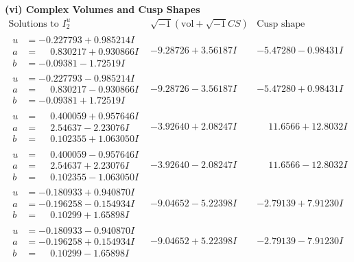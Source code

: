 \documentclass[1p]{elsarticle_modified}
\theoremstyle{definition}
\newcommand{\I}{\sqrt{-1}}
\begin{document}
\newpage\flushleft \textbf{(vi) Complex Volumes and Cusp Shapes}
$$\begin{array}{c|c|c}  
\text{Solutions to }I^u_{2}& \I (\text{vol} + \sqrt{-1}CS) & \text{Cusp shape}\\
 \hline 
\begin{aligned}
u &= -0.227793 + 0.985214 I \\
a &= \phantom{-}0.830217 + 0.930866 I \\
b &= -0.09381 - 1.72519 I\end{aligned}
 & -9.28726 + 3.56187 I & -5.47280 - 0.98431 I \\ \hline\begin{aligned}
u &= -0.227793 - 0.985214 I \\
a &= \phantom{-}0.830217 - 0.930866 I \\
b &= -0.09381 + 1.72519 I\end{aligned}
 & -9.28726 - 3.56187 I & -5.47280 + 0.98431 I \\ \hline\begin{aligned}
u &= \phantom{-}0.400059 + 0.957646 I \\
a &= \phantom{-}2.54637 - 2.23076 I \\
b &= \phantom{-}0.102355 + 1.063050 I\end{aligned}
 & -3.92640 + 2.08247 I & \phantom{-}11.6566 + 12.8032 I \\ \hline\begin{aligned}
u &= \phantom{-}0.400059 - 0.957646 I \\
a &= \phantom{-}2.54637 + 2.23076 I \\
b &= \phantom{-}0.102355 - 1.063050 I\end{aligned}
 & -3.92640 - 2.08247 I & \phantom{-}11.6566 - 12.8032 I \\ \hline\begin{aligned}
u &= -0.180933 + 0.940870 I \\
a &= -0.196258 - 0.154934 I \\
b &= \phantom{-}0.10299 + 1.65898 I\end{aligned}
 & -9.04652 - 5.22398 I & -2.79139 + 7.91230 I \\ \hline\begin{aligned}
u &= -0.180933 - 0.940870 I \\
a &= -0.196258 + 0.154934 I \\
b &= \phantom{-}0.10299 - 1.65898 I\end{aligned}
 & -9.04652 + 5.22398 I & -2.79139 - 7.91230 I \\ \hline\begin{aligned}

\end{aligned}
\end{array}$$
\end{document}
